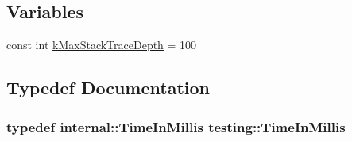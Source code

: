 \subsection*{Variables}
\begin{DoxyCompactItemize}
\item 
const int \hyperlink{namespacetesting_ae605f2ccac04616bb7812ca72e517082}{k\-Max\-Stack\-Trace\-Depth} = 100
\end{DoxyCompactItemize}


\subsection{Typedef Documentation}
\hypertarget{namespacetesting_a992de1d091ce660f451d1e8b3ce30fd6}{
\subsubsection[{Time\-In\-Millis}]{\setlength{\rightskip}{0pt plus 5cm}typedef {\bf internal\-::\-Time\-In\-Millis} {\bf testing\-::\-Time\-In\-Millis}}}\label{namespacetesting_a992de1d091ce660f451d1e8b3ce30fd6}


